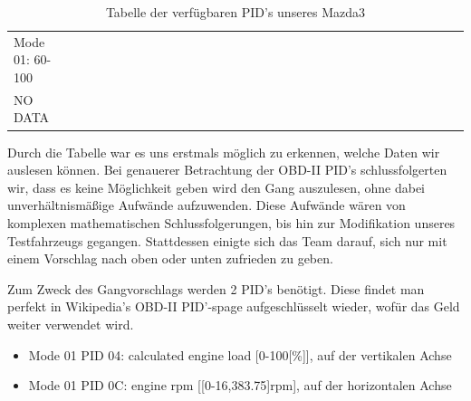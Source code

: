 \begin{table}[!htb]
{\begin{tabular}{lcccccccccccccccccccccccccccccccc}
\cellcolor[HTML]{9B9B9B}Mode 01: 60-100 & \multicolumn{1}{l}{} & \multicolumn{1}{l}{} & \multicolumn{1}{l}{} & \multicolumn{1}{l}{} & \multicolumn{1}{l}{} & \multicolumn{1}{l}{} & \multicolumn{1}{l}{} & \multicolumn{1}{l}{} & \multicolumn{1}{l}{} & \multicolumn{1}{l}{} & \multicolumn{1}{l}{} & \multicolumn{1}{l}{} & \multicolumn{1}{l}{} & \multicolumn{1}{l}{} & \multicolumn{1}{l}{} & \multicolumn{1}{l}{} & \multicolumn{1}{l}{} & \multicolumn{1}{l}{} & \multicolumn{1}{l}{} & \multicolumn{1}{l}{} & \multicolumn{1}{l}{} & \multicolumn{1}{l}{} & \multicolumn{1}{l}{} & \multicolumn{1}{l}{} & \multicolumn{1}{l}{} & \multicolumn{1}{l}{} & \multicolumn{1}{l}{} & \multicolumn{1}{l}{} & \multicolumn{1}{l}{} & \multicolumn{1}{l}{} & \multicolumn{1}{l}{} & \multicolumn{1}{l}{} \\ \cline{1-1}
\multicolumn{1}{|l|}{NO DATA} & \multicolumn{1}{l}{} & \multicolumn{1}{l}{} & \multicolumn{1}{l}{} & \multicolumn{1}{l}{} & \multicolumn{1}{l}{} & \multicolumn{1}{l}{} & \multicolumn{1}{l}{} & \multicolumn{1}{l}{} & \multicolumn{1}{l}{} & \multicolumn{1}{l}{} & \multicolumn{1}{l}{} & \multicolumn{1}{l}{} & \multicolumn{1}{l}{} & \multicolumn{1}{l}{} & \multicolumn{1}{l}{} & \multicolumn{1}{l}{} & \multicolumn{1}{l}{} & \multicolumn{1}{l}{} & \multicolumn{1}{l}{} & \multicolumn{1}{l}{} & \multicolumn{1}{l}{} & \multicolumn{1}{l}{} & \multicolumn{1}{l}{} & \multicolumn{1}{l}{} & \multicolumn{1}{l}{} & \multicolumn{1}{l}{} & \multicolumn{1}{l}{} & \multicolumn{1}{l}{} & \multicolumn{1}{l}{} & \multicolumn{1}{l}{} & \multicolumn{1}{l}{} & \multicolumn{1}{l}{} \\ \cline{1-1}
\end{tabular}}
\caption{Tabelle der verfügbaren PID's unseres Mazda3}
\label{tableMazda3}
\end{table}

Durch die Tabelle war es uns erstmals möglich zu erkennen, welche Daten wir auslesen können. Bei genauerer Betrachtung der OBD-II PID's schlussfolgerten wir, dass es keine Möglichkeit geben wird den Gang auszulesen, ohne dabei unverhältnismäßige Aufwände aufzuwenden. Diese Aufwände wären von komplexen mathematischen Schlussfolgerungen, bis hin zur Modifikation unseres Testfahrzeugs gegangen. Stattdessen einigte sich das Team darauf, sich nur mit einem Vorschlag nach oben oder unten zufrieden zu geben. 

Zum Zweck des Gangvorschlags werden 2 PID's benötigt. Diese findet man perfekt in Wikipedia's OBD-II PID'-spage aufgeschlüsselt wieder, wofür das Geld weiter verwendet wird.
\begin{itemize}
	\item Mode 01 PID 04: calculated engine load [0-100[\%]], auf der vertikalen Achse
	\item Mode 01 PID 0C: engine rpm [[0-16,383.75]rpm], auf der horizontalen Achse
\end{itemize} 

